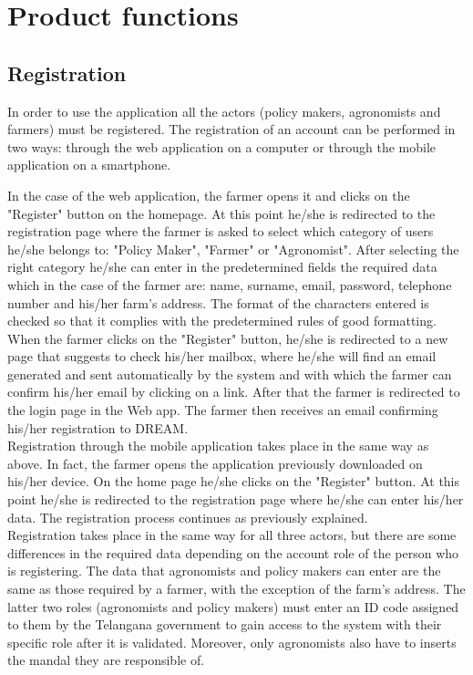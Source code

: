 \section{Product functions}

\subsection{Registration}
In order to use the application all the actors (policy makers, agronomists and farmers) must be registered. The registration of an account can be performed in two ways: through the web application on a computer or through the mobile application on a smartphone.

In the case of the web application, the farmer opens it and clicks on the "Register" button on the homepage. At this point he/she is redirected to the registration page where the farmer is asked to select which category of users he/she belongs to: "Policy Maker", "Farmer" or "Agronomist".
After selecting the right category he/she can enter in the predetermined fields the required data which in the case of the farmer are: name, surname, email, password, telephone number and his/her farm's address. The format of the characters entered is checked so that it complies with the predetermined rules of good formatting. 
When the farmer clicks on the "Register" button, he/she is redirected to a new page that suggests to check his/her mailbox, where he/she will find an email generated and sent automatically by the system and with which the farmer can confirm his/her email by clicking on a link. After that the farmer is redirected to the login page in the Web app. The farmer then receives an email confirming his/her registration to DREAM.\\

Registration through the mobile application takes place in the same way as above. In fact, the farmer opens the application previously downloaded on his/her device. On the home page he/she clicks on the "Register" button. At this point he/she is redirected to the registration page where he/she can enter his/her data. The registration process continues as previously explained.\\

Registration takes place in the same way for all three actors, but there are some differences in the required data depending on the account role of the person who is registering. The data that agronomists and policy makers can enter are the same as those required by a farmer, with the exception of the farm's address.
The latter two roles (agronomists and policy makers) must enter an ID code assigned to them by the Telangana government to gain access to the system with their specific role after it is validated.
Moreover, only agronomists also have to inserts the mandal they are responsible of.


